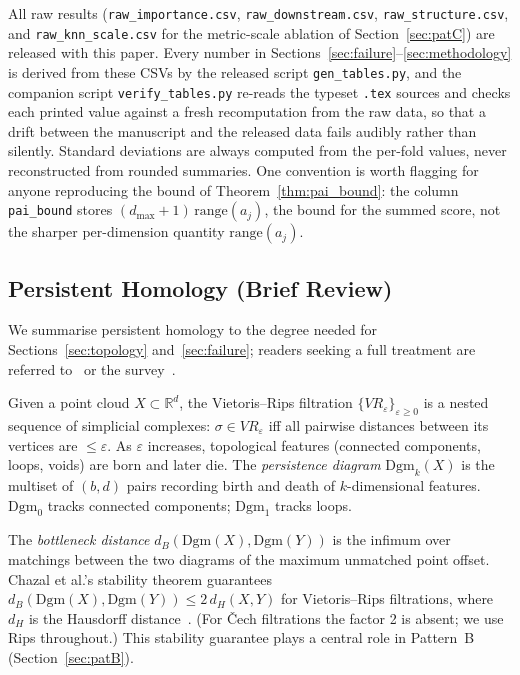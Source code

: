 All raw results (\texttt{raw\_importance.csv}, \texttt{raw\_downstream.csv},
\texttt{raw\_structure.csv}, and \texttt{raw\_knn\_scale.csv} for the
metric-scale ablation of Section~\ref{sec:patC}) are released with this
paper.  Every number in
Sections~\ref{sec:failure}--\ref{sec:methodology} is derived from these CSVs
by the released script \texttt{gen\_tables.py}, and the companion script
\texttt{verify\_tables.py} re-reads the typeset \texttt{.tex} sources and
checks each printed value against a fresh recomputation from the raw data,
so that a drift between the manuscript and the released data fails
audibly rather than silently.  Standard deviations are always computed from
the per-fold values, never reconstructed from rounded summaries.  One
convention is worth flagging for anyone reproducing the bound of
Theorem~\ref{thm:pai_bound}: the column \texttt{pai\_bound} stores
$(d_{\max}+1)\,\mathrm{range}(a_j)$, the bound for the summed score, not the
sharper per-dimension quantity $\mathrm{range}(a_j)$.

\subsection{Persistent Homology (Brief Review)}
\label{sec:ph}

We summarise persistent homology to the degree needed for
Sections~\ref{sec:topology} and~\ref{sec:failure}; readers seeking a full
treatment are referred to~\cite{Edelsbrunner2010} or the survey~\cite{Su2025TDA}.

Given a point cloud $X \subset \mathbb{R}^d$, the Vietoris--Rips filtration
$\{VR_\varepsilon\}_{\varepsilon \geq 0}$ is a nested sequence of simplicial
complexes: $\sigma \in VR_\varepsilon$ iff all pairwise distances between
its vertices are $\leq \varepsilon$.  As $\varepsilon$ increases, topological
features (connected components, loops, voids) are born and later die.
The \emph{persistence diagram} $\mathrm{Dgm}_k(X)$ is the multiset of
$(b,d)$ pairs recording birth and death of $k$-dimensional features.
$\mathrm{Dgm}_0$ tracks connected components; $\mathrm{Dgm}_1$ tracks loops.

The \emph{bottleneck distance} $d_B(\mathrm{Dgm}(X), \mathrm{Dgm}(Y))$ is
the infimum over matchings between the two diagrams of the maximum unmatched
point offset.  Chazal et al.'s stability theorem guarantees
$d_B(\mathrm{Dgm}(X), \mathrm{Dgm}(Y)) \leq 2\,d_H(X,Y)$
for Vietoris--Rips filtrations, where $d_H$ is the Hausdorff
distance~\cite{Chazal2009Stability,CohenSteiner2007stability}.
(For \v{C}ech filtrations the factor 2 is absent; we use Rips throughout.)
This stability guarantee plays a central role in Pattern~B
(Section~\ref{sec:patB}).
